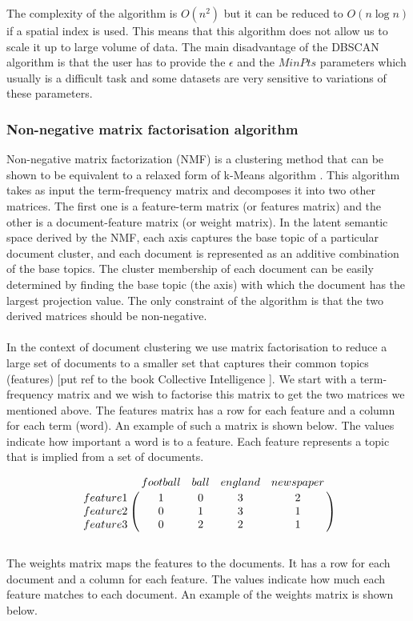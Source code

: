 The complexity of the algorithm is $O(n^2)$ but it can be reduced to $O(n\log n)$ if a spatial index is used. This means that this algorithm does not allow us to scale it up to large volume of data. The main disadvantage of the DBSCAN algorithm is that the user has to provide the $\epsilon $ and the $MinPts$ parameters which usually is a difficult task and some datasets are very sensitive to variations of these parameters. 

\subsubsection{Non-negative matrix factorisation algorithm}
Non-negative matrix factorization (NMF) is a clustering method that can be shown to be equivalent to a relaxed form of k-Means algorithm \citep{Ding05onthe}. This algorithm takes as input the term-frequency matrix and decomposes it into two other matrices. The first one is a feature-term matrix (or features matrix) and the other is a document-feature matrix (or weight matrix). In the latent semantic space derived by the NMF, each axis captures the base topic of a particular document cluster, and each document is represented as an additive combination of the base topics. The cluster membership of each document can be easily determined by finding the base topic (the axis) with which the document has the largest projection value. The only constraint of the algorithm is that the two derived matrices should be non-negative.\\\\ 
In the context of document clustering we use matrix factorisation to reduce a large set of documents to a smaller set that captures their common topics (features) [put ref to the book Collective Intelligence ]. We start with a term-frequency matrix and we wish to factorise this matrix to get the two matrices we mentioned above. The features matrix has a row for each feature and a column for each term (word). An example of such a matrix is shown below. The values indicate how important a word is to a feature. Each feature represents a topic that is implied from a set of documents. 

\[
\bordermatrix{~ & football & ball & england & newspaper \cr
                  feature 1 & 1 & 0 & 3 & 2 \cr
                  feature 2 & 0 & 1 & 3 & 1\cr
                  feature 3 & 0 & 2 & 2 & 1\cr}
\]\\
The weights matrix maps the features to the documents. It has a row for each document and a column for each feature. The values indicate how much each feature matches to each document. An example of the weights matrix is shown below. 

